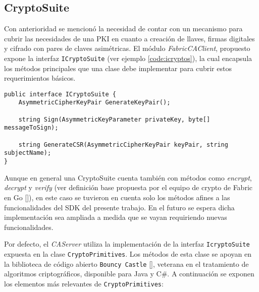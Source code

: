\subsection{CryptoSuite}\label{subchapter:cryptoEp}


Con anterioridad se mencion\'o la necesidad de contar con un mecanismo para cubrir las necesidades de una PKI en cuanto a creaci\'on de llaves, firmas digitales y cifrado con pares de claves asimétricas. El m\'odulo \emph{FabricCAClient}, propuesto expone la interfaz \texttt{ICryptoSuite} (ver ejemplo \ref{code:icryptos}), la cual encapsula los m\'etodos principales que una clase debe implementar para cubrir estos requerimientos b\'asicos. 

\begin{lstlisting}[caption={Interfaz \texttt{ICryptoSuite}.}, label={code:icryptos}]
public interface ICryptoSuite {
	AsymmetricCipherKeyPair GenerateKeyPair();
	
	string Sign(AsymmetricKeyParameter privateKey, byte[] messageToSign);
	
	string GenerateCSR(AsymmetricCipherKeyPair keyPair, string subjectName);
}
\end{lstlisting}

Aunque en general una CryptoSuite cuenta tambi\'en con m\'etodos como \emph{encrypt}, \emph{decrypt} y \emph{verify} (ver definici\'on base propuesta por el equipo de crypto de Fabric en Go [\cite{bccsp}]), en este caso se tuvieron en cuenta solo los m\'etodos afines a las funcionalidades del SDK del presente trabajo. En el futuro se espera dicha implementaci\'on sea ampliada a medida que se vayan requiriendo nuevas funcionalidades.

Por defecto, el \emph{CAServer} utiliza la implementaci\'on de la interfaz \texttt{IcryptoSuite} expuesta en la clase \texttt{CryptoPrimitives}. Los m\'etodos de esta clase se apoyan en la biblioteca de código abierto \texttt{Bouncy Castle} [\cite{bouncycastle}], veterana en el tratamiento de algoritmos criptogr\'aficos, disponible para Java y C\#. A continuaci\'on se exponen los elementos m\'as relevantes de \texttt{CryptoPrimitives}:

